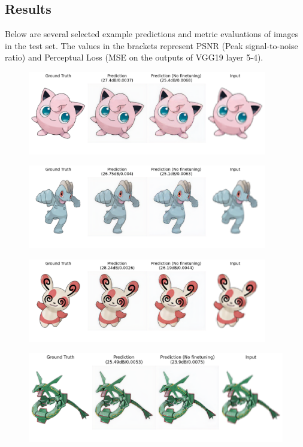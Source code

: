 \documentclass[11pt,titlepage]{article}
\begin{document}
\subsection*{Results}
Below are several selected example predictions and metric evaluations of images in the test set. The values in the brackets represent PSNR (Peak signal-to-noise ratio) and Perceptual Loss (MSE on the outputs of VGG19 layer 5-4).
\begin{figure}[H]
    \centering
    \includegraphics[width=0.93\textwidth]{results/039.png}
\end{figure}
\begin{figure}[H]
    \centering
    \includegraphics[width=0.93\textwidth]{results/066.png}
\end{figure}
\begin{figure}[H]
    \centering
    \includegraphics[width=0.93\textwidth]{results/327.png}
\end{figure}
\begin{figure}[H]
    \centering
    \includegraphics[width=\textwidth]{results/384.png}
\end{figure}
\end{document}
